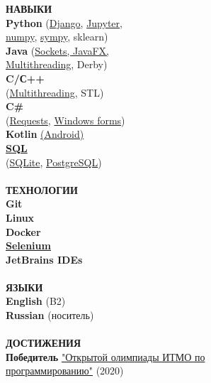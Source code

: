 \documentclass{article}
\begin{document}
\begin{vwcol}[widths={0.8,0.2},
 sep=.8cm, justify=flush,rule=0pt,indent=1em]
\noindent\textcolor[rgb]{0.1255,0.2902,0.7843}{\textbf{НАВЫКИ}}\\
\textbf{Python} (\href{https://github.com/igoose1/wikirace}{Django}, \href{https://github.com/NikPeg/synchronization-of-neuromorphic-networks-of-the-close-world-from-the-point-of-view-of-complexes}{Jupyter},\\
\href{https://github.com/NikPeg/Reinforcement-learning-for-resource-allocation-tasks-in-the-cloud}{numpy}, \href{https://github.com/NikPeg/Calculus_and_Algebra_sympy}{sympy}, sklearn)\\
\textbf{Java} (\href{https://github.com/NikPeg/jigsaw_sockets_and_saving}{Sockets, JavaFX,}\\
\href{https://github.com/NikPeg/StudentsBooks}{Multithreading}, Derby)\\
\textbf{C/С++}\\
(\href{https://github.com/NikPeg/OS_multithreaded_tasks}{Multithreading}, STL)\\
\textbf{C\#}\\
(\href{https://gitlab.com/peganov.nik/messengerapi}{Requests}, \href{https://gitlab.com/peganov.nik/diveintofractal}{Windows forms})\\
\textbf{Kotlin} \href{https://gitlab.com/peganov.nik/smartlearning}{(Android)}\\
\textbf{\href{https://github.com/NikPeg/CoffeePult}{SQL}}\\
(\href{https://github.com/NikPeg/ExtraterrestrialBot}{SQLite}, \href{https://github.com/NikPeg/CoffeePult}{PostgreSQL})\\
\\
\noindent\textcolor[rgb]{0.1255,0.2902,0.7843}{\textbf{ТЕХНОЛОГИИ}}\\
\textbf{
Git\\
Linux\\
Docker\\
\href{https://github.com/NikPeg/csbot}{Selenium}\\
JetBrains IDEs\\
}
\\
\noindent\textcolor[rgb]{0.1255,0.2902,0.7843}{\textbf{ЯЗЫКИ}}\\
\textbf{English} (B2)\\
\textbf{Russian} (носитель)\\
\\
\noindent\textcolor[rgb]{0.1255,0.2902,0.7843}{\textbf{ДОСТИЖЕНИЯ}}\\
\textbf{Победитель} \href{https://olymp.itmo.ru/}{"Открытой олимпиады ИТМО по\\программированию"} (2020)\\

\end{vwcol}
\end{document}
